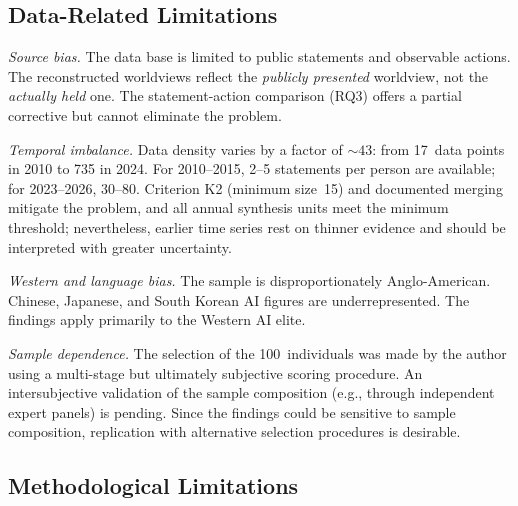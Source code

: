 \documentclass[12pt,a4paper]{article}
\begin{document}
\subsection{Data-Related Limitations}

\emph{Source bias.} The data base is limited to public statements and observable actions. The reconstructed worldviews reflect the \emph{publicly presented} worldview, not the \emph{actually held} one. The statement-action comparison (RQ3) offers a partial corrective but cannot eliminate the problem.

\emph{Temporal imbalance.} Data density varies by a factor of ${\sim}43$: from 17~data points in 2010 to 735 in 2024. For 2010--2015, 2--5 statements per person are available; for 2023--2026, 30--80. Criterion K2 (minimum size~15) and documented merging mitigate the problem, and all annual synthesis units meet the minimum threshold; nevertheless, earlier time series rest on thinner evidence and should be interpreted with greater uncertainty.

\emph{Western and language bias.} The sample is disproportionately Anglo-American. Chinese, Japanese, and South Korean AI figures are underrepresented. The findings apply primarily to the Western AI elite.

\emph{Sample dependence.} The selection of the 100~individuals was made by the author using a multi-stage but ultimately subjective scoring procedure. An intersubjective validation of the sample composition (e.g., through independent expert panels) is pending. Since the findings could be sensitive to sample composition, replication with alternative selection procedures is desirable.


\subsection{Methodological Limitations}
\end{document}
